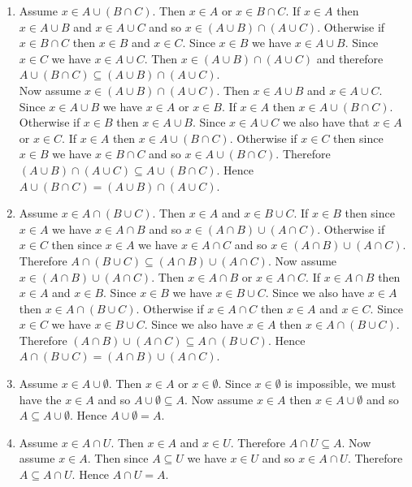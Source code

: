 \documentclass[12pt]{book}
\begin{document}
\begin{enumerate}
\item Assume $x \in A \cup (B \cap C)$. Then $x \in A$ or $x \in B \cap C$. If $x \in A$ then $x \in A \cup B$ and $x \in A \cup C$ and so $x \in (A \cup B) \cap (A \cup C)$. Otherwise if $x \in B \cap C$ then $x \in B$ and $x \in C$. Since $x \in B$ we have $x \in A \cup B$. Since $x \in C$ we have $x \in A \cup C$. Then $x \in (A \cup B) \cap (A \cup C)$ and therefore $A \cup (B \cap C) \subseteq (A \cup B) \cap (A \cup C)$.\\ Now assume $x \in (A \cup B) \cap (A \cup C)$. Then $x \in A \cup B$ and $x \in A \cup C$. Since $x \in A \cup B$ we have $x \in A$ or $x \in B$. If $x \in A$ then $x \in A \cup (B \cap C)$. Otherwise if $x \in B$ then $x \in A \cup B$. Since $x \in A \cup C$ we also have that $x \in A$ or $x \in C$. If $x \in A$ then $x \in A \cup (B \cap C)$. Otherwise if $x \in C$ then since $x \in B$ we have $x \in B \cap C$ and so $x \in A \cup (B \cap C)$. Therefore $(A \cup B) \cap (A \cup C) \subseteq A \cup (B \cap C)$. Hence $A \cup (B \cap C) = (A \cup B) \cap (A \cup C)$.
\renewcommand{\labelenumi}{\arabic{enumi}'.}
\setcounter{enumi}{2}
\item Assume $x \in A \cap (B \cup C)$. Then $x \in A$ and $x \in B \cup C$. If $x \in B$ then since $x \in A$ we have $x \in A \cap B$ and so $x \in (A \cap B) \cup (A \cap C)$. Otherwise if $x \in C$ then since $x \in A$ we have $x \in A \cap C$ and so $x \in (A \cap B) \cup (A \cap C)$. Therefore $A \cap (B \cup C) \subseteq (A \cap B) \cup (A \cap C)$. Now assume $x \in (A \cap B) \cup (A \cap C)$. Then $x \in A \cap B$ or $x \in A \cap C$. If $x \in A \cap B$ then $x \in A$ and $x \in B$. Since $x \in B$ we have $x \in B \cup C$. Since we also have $x \in A$ then $x \in A \cap (B \cup C)$. Otherwise if $x \in A \cap C$ then $x \in A$ and $x \in C$. Since $x \in C$ we have $x \in B \cup C$. Since we also have $x \in A$ then $x \in A \cap (B \cup C)$. Therefore $(A \cap B) \cup (A \cap C) \subseteq A \cap (B \cup C)$. Hence $A \cap (B \cup C) = (A \cap B) \cup (A \cap C)$.
\renewcommand{\labelenumi}{\arabic{enumi}.}
\setcounter{enumi}{3}
\item Assume $x \in A \cup \emptyset$. Then $x \in A$ or $x \in \emptyset$. Since $x \in \emptyset$ is impossible, we must have the $x \in A$ and so $A \cup \emptyset \subseteq A$. Now assume $x \in A$ then $x \in A \cup \emptyset$ and so $A \subseteq A \cup \emptyset$. Hence $A \cup \emptyset = A$.
\renewcommand{\labelenumi}{\arabic{enumi}'.}
\setcounter{enumi}{3}
\item Assume $x \in A \cap U$. Then $x \in A$ and $x \in U$. Therefore $A \cap U \subseteq A$. Now assume $x \in A$. Then since $A \subseteq U$ we have $x \in U$ and so $x \in A \cap U$. Therefore $A \subseteq A \cap U$. Hence $A \cap U = A$.

\end{enumerate}
\end{document}
